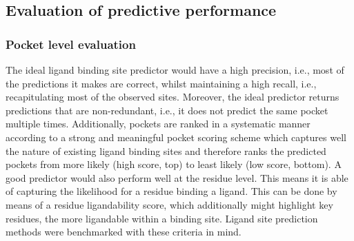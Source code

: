 \subsection{Evaluation of predictive performance}

\subsubsection{Pocket level evaluation}

The ideal ligand binding site predictor would have a high precision, i.e., most of the predictions it makes are correct, whilst maintaining a high recall, i.e., recapitulating most of the observed sites. Moreover, the ideal predictor returns predictions that are non-redundant, i.e., it does not predict the same pocket multiple times. Additionally, pockets are ranked in a systematic manner according to a strong and meaningful pocket scoring scheme which captures well the nature of existing ligand binding sites and therefore ranks the predicted pockets from more likely (high score, top) to least likely (low score, bottom). A good predictor would also perform well at the residue level. This means it is able of capturing the likelihood for a residue binding a ligand. This can be done by means of a residue ligandability score, which additionally might highlight key residues, the more ligandable within a binding site. Ligand site prediction methods were benchmarked with these criteria in mind.

